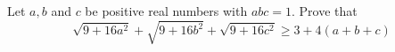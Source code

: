 Let $ a,b$ and $ c $ be positive real numbers with $ abc = 1 $. Prove that\[ \sqrt{ 9 + 16a^2}+\sqrt{ 9 + 16b^2}+\sqrt{ 9 + 16c^2} \ge 3 +4(a+b+c)\]